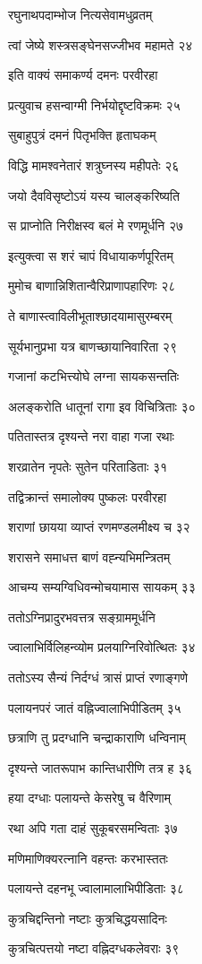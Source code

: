 रघुनाथपदाम्भोज नित्यसेवामधुव्रतम्

त्वां जेष्ये शस्त्रसङ्घेनसज्जीभव महामते २४

इति वाक्यं समाकर्ण्य दमनः परवीरहा

प्रत्युवाच हसन्वाग्मी निर्भयोद्दृष्टविक्रमः २५

सुबाहुपुत्रं दमनं पितृभक्ति हृताघकम्

विद्धि मामश्वनेतारं शत्रुघ्नस्य महीपतेः २६

जयो दैवविसृष्टोऽयं यस्य चालङ्करिष्यति

स प्राप्नोति निरीक्षस्व बलं मे रणमूर्धनि २७

इत्युक्त्वा स शरं चापं विधायाकर्णपूरितम्

मुमोच बाणान्निशितान्वैरिप्राणापहारिणः २८

ते बाणास्त्वाविलीभूताश्छादयामासुरम्बरम्

सूर्यभानुप्रभा यत्र बाणच्छायानिवारिता २९

गजानां कटभित्त्योघे लग्ना सायकसन्ततिः

अलङ्करोति धातूनां रागा इव विचित्रिताः ३०

पतितास्तत्र दृश्यन्ते नरा वाहा गजा रथाः

शरव्रातेन नृपतेः सुतेन परिताडिताः ३१

तद्विक्रान्तं समालोक्य पुष्कलः परवीरहा

शराणां छायया व्याप्तं रणमण्डलमीक्ष्य च ३२

शरासने समाधत्त बाणं वह्न्यभिमन्त्रितम्

आचम्य सम्यग्विधिवन्मोचयामास सायकम् ३३

ततोऽग्निप्रादुरभवत्तत्र सङ्ग्राममूर्धनि

ज्वालाभिर्विलिहन्व्योम प्रलयाग्निरिवोत्थितः ३४

ततोऽस्य सैन्यं निर्दग्धं त्रासं प्राप्तं रणाङ्गणे

पलायनपरं जातं वह्निज्वालाभिपीडितम् ३५

छत्राणि तु प्रदग्धानि चन्द्राकाराणि धन्विनाम्

दृश्यन्ते जातरूपाभ कान्तिधारीणि तत्र ह ३६

हया दग्धाः पलायन्ते केसरेषु च वैरिणाम्

रथा अपि गता दाहं सुकूबरसमन्विताः ३७

मणिमाणिक्यरत्नानि वहन्तः करभास्ततः

पलायन्ते दहनभू ज्वालामालाभिपीडिताः ३८

कुत्रचिद्दन्तिनो नष्टाः कुत्रचिद्धयसादिनः

कुत्रचित्पत्तयो नष्टा वह्निदग्धकलेवराः ३९

